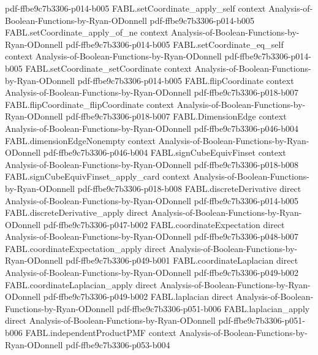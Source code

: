 \begin{theorem}
  {pdf-ffbe9c7b3306-p014-b005}
\proofstep
  {FABL.setCoordinate_apply_self}
  {context}
  {Analysis-of-Boolean-Functions-by-Ryan-ODonnell}
  {pdf-ffbe9c7b3306-p014-b005}
\proofstep
  {FABL.setCoordinate_apply_of_ne}
  {context}
  {Analysis-of-Boolean-Functions-by-Ryan-ODonnell}
  {pdf-ffbe9c7b3306-p014-b005}
\proofstep
  {FABL.setCoordinate_eq_self}
  {context}
  {Analysis-of-Boolean-Functions-by-Ryan-ODonnell}
  {pdf-ffbe9c7b3306-p014-b005}
\proofstep
  {FABL.setCoordinate_setCoordinate}
  {context}
  {Analysis-of-Boolean-Functions-by-Ryan-ODonnell}
  {pdf-ffbe9c7b3306-p014-b005}
\proofstep
  {FABL.flipCoordinate}
  {context}
  {Analysis-of-Boolean-Functions-by-Ryan-ODonnell}
  {pdf-ffbe9c7b3306-p018-b007}
\proofstep
  {FABL.flipCoordinate_flipCoordinate}
  {context}
  {Analysis-of-Boolean-Functions-by-Ryan-ODonnell}
  {pdf-ffbe9c7b3306-p018-b007}
\proofstep
  {FABL.DimensionEdge}
  {context}
  {Analysis-of-Boolean-Functions-by-Ryan-ODonnell}
  {pdf-ffbe9c7b3306-p046-b004}
\proofstep
  {FABL.dimensionEdgeNonempty}
  {context}
  {Analysis-of-Boolean-Functions-by-Ryan-ODonnell}
  {pdf-ffbe9c7b3306-p046-b004}
\proofstep
  {FABL.signCubeEquivFinset}
  {context}
  {Analysis-of-Boolean-Functions-by-Ryan-ODonnell}
  {pdf-ffbe9c7b3306-p018-b008}
\proofstep
  {FABL.signCubeEquivFinset_apply_card}
  {context}
  {Analysis-of-Boolean-Functions-by-Ryan-ODonnell}
  {pdf-ffbe9c7b3306-p018-b008}
\proofstep
  {FABL.discreteDerivative}
  {direct}
  {Analysis-of-Boolean-Functions-by-Ryan-ODonnell}
  {pdf-ffbe9c7b3306-p014-b005}
\proofstep
  {FABL.discreteDerivative_apply}
  {direct}
  {Analysis-of-Boolean-Functions-by-Ryan-ODonnell}
  {pdf-ffbe9c7b3306-p047-b002}
\proofstep
  {FABL.coordinateExpectation}
  {direct}
  {Analysis-of-Boolean-Functions-by-Ryan-ODonnell}
  {pdf-ffbe9c7b3306-p048-b007}
\proofstep
  {FABL.coordinateExpectation_apply}
  {direct}
  {Analysis-of-Boolean-Functions-by-Ryan-ODonnell}
  {pdf-ffbe9c7b3306-p049-b001}
\proofstep
  {FABL.coordinateLaplacian}
  {direct}
  {Analysis-of-Boolean-Functions-by-Ryan-ODonnell}
  {pdf-ffbe9c7b3306-p049-b002}
\proofstep
  {FABL.coordinateLaplacian_apply}
  {direct}
  {Analysis-of-Boolean-Functions-by-Ryan-ODonnell}
  {pdf-ffbe9c7b3306-p049-b002}
\proofstep
  {FABL.laplacian}
  {direct}
  {Analysis-of-Boolean-Functions-by-Ryan-ODonnell}
  {pdf-ffbe9c7b3306-p051-b006}
\proofstep
  {FABL.laplacian_apply}
  {direct}
  {Analysis-of-Boolean-Functions-by-Ryan-ODonnell}
  {pdf-ffbe9c7b3306-p051-b006}
\proofstep
  {FABL.independentProductPMF}
  {context}
  {Analysis-of-Boolean-Functions-by-Ryan-ODonnell}
  {pdf-ffbe9c7b3306-p053-b004}

\end{theorem}
